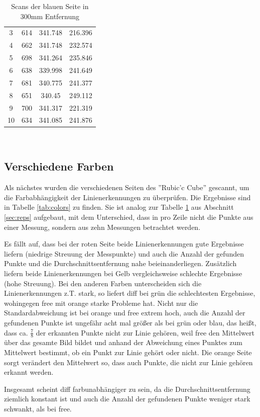\documentclass[ngerman,a4paper,parskip=half]{scrartcl}
\begin{document}
\begin{table}[H]
\begin{tabular}{c|c|c|c}
		3 & 614 & 341.748 & 216.396 \\
		4 & 662 & 341.748 & 232.574 \\
		5 & 698 & 341.264 & 235.846 \\
		6 & 638 & 339.998 & 241.649 \\
		7 & 681 & 340.775 & 241.377 \\
		8 & 651 & 340.45 & 249.112 \\
		9 & 700 & 341.317 & 221.319 \\
		10 & 634 & 341.085 & 241.876 \\
		\end{tabular} \
	\caption{Scans der blauen Seite in 300mm Entfernung}
	\label{tab:reps}
\end{table}

\subsection{Verschiedene Farben}
\label{sec:cols}

Als nächstes wurden die verschiedenen Seiten des ''Rubic'c Cube'' gescannt, um die Farbabhängigkeit der Linienerkennungen zu überprüfen. Die Ergebnisse sind in Tabelle \ref{tab:colors} zu finden. Sie ist analog zur Tabelle \ref{tab:reps} aus Abschnitt \ref{sec:reps} aufgebaut, mit dem Unterschied, dass in pro Zeile nicht die Punkte aus einer Messung, sondern aus zehn Messungen betrachtet werden.

Es fällt auf, dass bei der roten Seite beide Linienerkennungen gute Ergebnisse liefern (niedrige Streuung der Messpunkte) und auch die Anzahl der gefunden Punkte und die Durchschnittsentfernung nahe beieinanderliegen. Zusätzlich liefern beide Linienerkennungen bei Gelb vergleichsweise schlechte Ergebnisse (hohe Streuung). Bei den anderen Farben unterscheiden sich die Linienerkennungen z.T. stark, so liefert diff bei grün die schlechtesten Ergebnisse, wohingegen free mit orange starke Probleme hat. Nicht nur die Standardabweichung ist bei orange und free extrem hoch, auch die Anzahl der gefundenen Punkte ist ungefähr acht mal größer als bei grün oder blau, das heißt, dass ca. $\frac{7}{8}$ der erkannten Punkte nicht zur Linie gehören, weil free den Mittelwert über das gesamte Bild bildet und anhand der Abweichung eines Punktes zum Mittelwert bestimmt, ob ein Punkt zur Linie gehört oder nicht. Die orange Seite sorgt verändert den Mittelwert so, dass auch Punkte, die nicht zur Linie gehören erkannt werden.

Insgesamt scheint diff farbunabhängiger zu sein, da die Durchschnittsentfernung ziemlich konstant ist und auch die Anzahl der gefundenen Punkte weniger stark schwankt, als bei free. 
\end{document}
